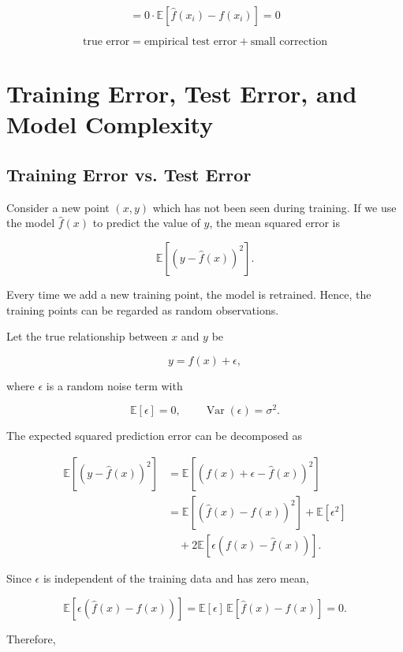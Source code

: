 \documentclass{article}
\begin{document}
\[
=0\cdot
\mathbb{E}
\left[
\hat{f}(x_i)-f(x_i)
\right]
=0
\]

\vspace{0.4cm}

\[
\boxed{
	\text{true error}
	=
	\text{empirical test error}
	+
	\text{small correction}
}
\]

\section{Training Error, Test Error, and Model Complexity}

\subsection{Training Error vs. Test Error}

Consider a new point $(x,y)$ which has not been seen during training. If we use the model $\hat{f}(x)$ to predict the value of $y$, the mean squared error is

\[
\mathbb{E}\left[(y-\hat{f}(x))^2\right].
\]

Every time we add a new training point, the model is retrained. Hence, the training points can be regarded as random observations.

Let the true relationship between $x$ and $y$ be

\[
y=f(x)+\epsilon,
\]

where $\epsilon$ is a random noise term with

\[
\mathbb{E}[\epsilon]=0,
\qquad
\operatorname{Var}(\epsilon)=\sigma^2.
\]

The expected squared prediction error can be decomposed as

\begin{align}
	\mathbb{E}\left[(y-\hat{f}(x))^2\right]
	&=
	\mathbb{E}\left[
	\left(f(x)+\epsilon-\hat{f}(x)\right)^2
	\right] \\
	&=
	\mathbb{E}\left[
	\left(\hat{f}(x)-f(x)\right)^2
	\right]
	+
	\mathbb{E}[\epsilon^2] \nonumber\\
	&\quad
	+2\mathbb{E}\left[
	\epsilon\left(f(x)-\hat{f}(x)\right)
	\right].
\end{align}

Since $\epsilon$ is independent of the training data and has zero mean,

\[
\mathbb{E}\left[
\epsilon\left(\hat{f}(x)-f(x)\right)
\right]
=
\mathbb{E}[\epsilon]\,
\mathbb{E}\left[
\hat{f}(x)-f(x)
\right]
=0.
\]

Therefore,
\end{document}

